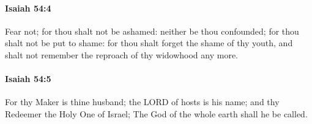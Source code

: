 		\paragraph{Isaiah 54:4} %
			\label{ISAIAH-54-4}

			Fear not; for thou shalt not be ashamed: neither be thou confounded; for thou shalt not be put to shame: for thou shalt forget the shame of thy youth, and shalt not remember the reproach of thy widowhood any more.


		\paragraph{Isaiah 54:5} %
			\label{ISAIAH-54-5}

			For thy Maker is thine husband; the LORD of hosts is his name; and thy Redeemer the Holy One of Israel; The God of the whole earth shall he be called.


